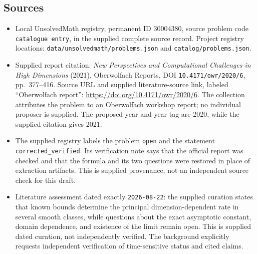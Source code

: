 \documentclass[11pt]{article}
\begin{document}
\subsection{Sources}
\begin{itemize}
\item Local UnsolvedMath registry, permanent ID \(30004380\), source problem code \texttt{catalogue entry}, in the supplied complete source record. Project registry locations: \texttt{data/unsolvedmath/problems.json} and \texttt{catalog/problems.json}.
\item Supplied report citation: \emph{New Perspectives and Computational Challenges in High Dimensions} (2021), Oberwolfach Reports, DOI \texttt{10.4171/owr/2020/6}, pp.\ 377--416. Source URL and supplied literature-source link, labeled ``Oberwolfach report'': \url{https://doi.org/10.4171/owr/2020/6}. The collection attributes the problem to an Oberwolfach workshop report; no individual proposer is supplied. The proposed year and year tag are 2020, while the supplied citation gives 2021.
\item The supplied registry labels the problem \texttt{open} and the statement \texttt{corrected\_verified}. Its verification note says that the official report was checked and that the formula and its two questions were restored in place of extraction artifacts. This is supplied provenance, not an independent source check for this draft.
\item Literature assessment dated exactly \texttt{2026-08-22}: the supplied curation states that known bounds determine the principal dimension-dependent rate in several smooth classes, while questions about the exact asymptotic constant, domain dependence, and existence of the limit remain open. This is supplied dated curation, not independently verified. The background explicitly requests independent verification of time-sensitive status and cited claims.
\end{itemize}
\end{document}
